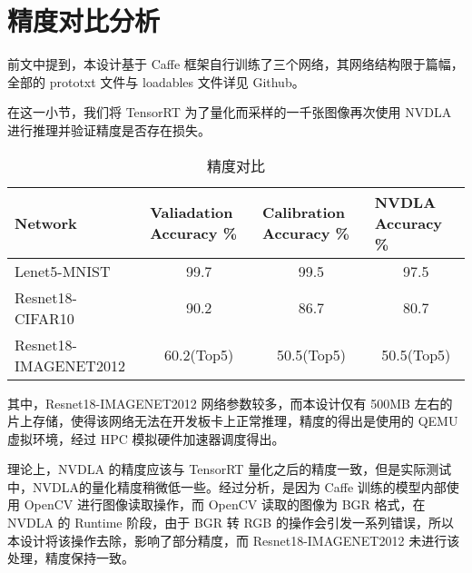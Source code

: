 \section{精度对比分析}

前文中提到，本设计基于 Caffe 框架自行训练了三个网络，其网络结构限于篇幅，全部的 prototxt 文件与 loadables 文件详见 Github\cite{nvdla_loadables}。

在这一小节，我们将 TensorRT 为了量化而采样的一千张图像再次使用 NVDLA 进行推理并验证精度是否存在损失。

\begin{table}[!htbp]
    \caption{精度对比}
    \label{tab:Qualifications Report}
    \centering
    \footnotesize%
    \setlength{\tabcolsep}{4pt}%
    \renewcommand{\arraystretch}{1.2}%
    \begin{tabular}{lccc}
        \toprule
        \textbf{Network}      & \multicolumn{1}{l}{\textbf{Valiadation Accuracy \%}} & \multicolumn{1}{l}{\textbf{Calibration Accuracy \%}}  & \multicolumn{1}{l}{\textbf{NVDLA Accuracy \%}} \\
        \midrule
        Lenet5-MNIST          & 99.7                                                 & 99.5                                                 & 97.5                                                 \\  
        Resnet18-CIFAR10      & 90.2                                                 & 86.7                                                 & 80.7                                                 \\
        Resnet18-IMAGENET2012 & 60.2(Top5)                                           & 50.5(Top5)                                           & 50.5(Top5)                                           \\
        \bottomrule                   
    \end{tabular}
\end{table}

其中，Resnet18-IMAGENET2012 网络参数较多，而本设计仅有 500MB 左右的片上存储，使得该网络无法在开发板卡上正常推理，精度的得出是使用的 QEMU 虚拟环境，经过 HPC 模拟硬件加速器调度得出。

理论上，NVDLA 的精度应该与 TensorRT 量化之后的精度一致，但是实际测试中，NVDLA的量化精度稍微低一些。经过分析，是因为 Caffe 训练的模型内部使用 OpenCV 进行图像读取操作，而 OpenCV 读取的图像为 BGR 格式，在 NVDLA 的 Runtime 阶段，由于 BGR 转 RGB 的操作会引发一系列错误，所以本设计将该操作去除，影响了部分精度，而 Resnet18-IMAGENET2012 未进行该处理，精度保持一致。

